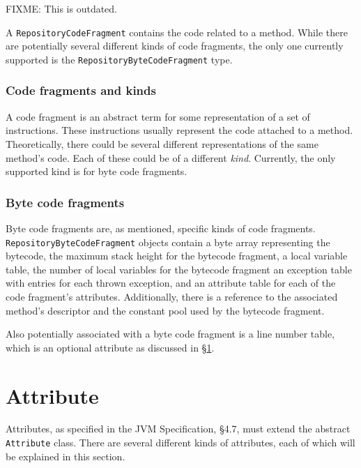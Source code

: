 \documentclass{report}
\begin{document}

FIXME: This is outdated.

A \texttt{RepositoryCodeFragment} contains the code related to a method.
While there are potentially several different kinds of code fragments,
the only one currently supported is the 
\texttt{Re\-pos\-i\-tory\-Byte\-Code\-Frag\-ment} type.

\subsubsection{Code fragments and kinds}

A code fragment is an abstract term for some representation of a set of
instructions. These instructions usually represent the code attached to
a method. Theoretically, there could be several different representations
of the same method's code. Each of these could be of a different
{\em kind}. Currently, the only supported kind is for byte code fragments.

\subsubsection{Byte code fragments}\label{bcf}

Byte code fragments are, as mentioned, specific kinds of code fragments.
\texttt{Re\-pos\-i\-tory\-Byte\-Code\-Frag\-ment} objects contain a byte array 
representing the bytecode, the maximum stack height for the bytecode fragment, 
a local variable table, the number of local variables for the bytecode 
fragment an exception table with entries for each thrown exception, 
and an attribute table for each of the code fragment's attributes. 
Additionally, there is a reference to the associated method's descriptor and 
the constant pool used by the bytecode fragment.

Also potentially associated with a byte code fragment is a line number table,
which is an optional attribute as discussed in \S \ref{attrib}.

\section{Attribute}\label{attrib}

Attributes, as specified in the JVM Specification, \S 4.7, 
must extend the abstract \texttt{Attribute} class. 
There are several different kinds of attributes, each of which will be 
explained in this section.
\end{document}
